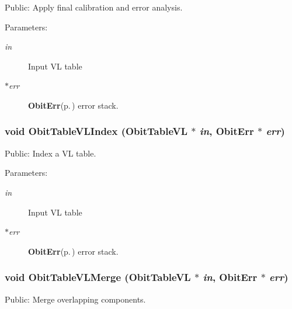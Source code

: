 Public: Apply final calibration and error analysis. 

\begin{Desc}
\item[Parameters:]
\begin{description}
\item[{\em in}]Input VL table \item[{\em $\ast$err}]{\bf Obit\-Err}{\rm (p.\,\pageref{structObitErr})} error stack. \end{description}
\end{Desc}
\subsubsection{\setlength{\rightskip}{0pt plus 5cm}void Obit\-Table\-VLIndex ({\bf Obit\-Table\-VL} $\ast$ {\em in}, {\bf Obit\-Err} $\ast$ {\em err})}\label{ObitTableVLUtil_8h_a1}


Public: Index a VL table. 

\begin{Desc}
\item[Parameters:]
\begin{description}
\item[{\em in}]Input VL table \item[{\em $\ast$err}]{\bf Obit\-Err}{\rm (p.\,\pageref{structObitErr})} error stack. \end{description}
\end{Desc}
\subsubsection{\setlength{\rightskip}{0pt plus 5cm}void Obit\-Table\-VLMerge ({\bf Obit\-Table\-VL} $\ast$ {\em in}, {\bf Obit\-Err} $\ast$ {\em err})}\label{ObitTableVLUtil_8h_a2}


Public: Merge overlapping components. 

